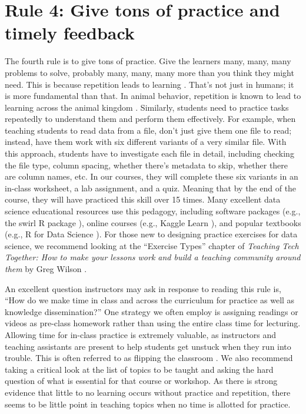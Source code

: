 \documentclass[
  10pt,
  letterpaper,
]{article}
\begin{document}
\section{Rule 4: Give tons of practice and timely
feedback}\label{sec-rule4}

The fourth rule is to give tons of practice. Give the learners many,
many, many problems to solve, probably many, many, many more than you
think they might need. This is because repetition leads to learning
\citep{ebbinghaus1913grundzuge}. That's not just in humans; it is more
fundamental than that. In animal behavior, repetition is known to lead
to learning across the animal kingdom
\citep{harris1943habituatory, hebb1949organization}. Similarly, students
need to practice tasks repeatedly to understand them and perform them
effectively. For example, when teaching students to read data from a
file, don't just give them one file to read; instead, have them work
with six different variants of a very similar file. With this approach,
students have to investigate each file in detail, including checking the
file type, column spacing, whether there's metadata to skip, whether
there are column names, etc. In our courses, they will complete these
six variants in an in-class worksheet, a lab assignment, and a quiz.
Meaning that by the end of the course, they will have practiced this
skill over 15 times. Many excellent data science educational resources
use this pedagogy, including software packages (e.g., the swirl R
package \citep{swirl}), online courses (e.g., Kaggle Learn
\citep{kaggle_learn}), and popular textbooks (e.g., R for Data Science
\citep{wickham2023}). For those new to designing practice exercises for
data science, we recommend looking at the ``Exercise Types'' chapter of
\emph{Teaching Tech Together: How to make your lessons work and build a
teaching community around them} by Greg Wilson
\citep{wilson2019teaching}.

An excellent question instructors may ask in response to reading this
rule is, ``How do we make time in class and across the curriculum for
practice as well as knowledge dissemination?'' One strategy we often
employ is assigning readings or videos as pre-class homework rather than
using the entire class time for lecturing. Allowing time for in-class
practice is extremely valuable, as instructors and teaching assistants
are present to help students get unstuck when they run into trouble.
This is often referred to as flipping the classroom
\citep{King01011993}. We also recommend taking a critical look at the
list of topics to be taught and asking the hard question of what is
essential for that course or workshop. As there is strong evidence that
little to no learning occurs without practice and repetition, there
seems to be little point in teaching topics when no time is allotted for
practice.
\end{document}
